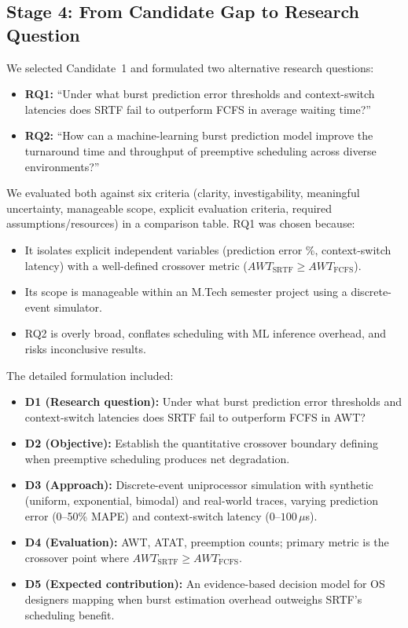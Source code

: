 \documentclass[11pt, a4paper]{article}
\begin{document}
\subsection{Stage 4: From Candidate Gap to Research Question}
We selected Candidate~1 and formulated two alternative research questions:

\begin{itemize}[nosep]
    \item \textbf{RQ1:} ``Under what burst prediction error thresholds and context-switch latencies does SRTF fail to outperform FCFS in average waiting time?''
    \item \textbf{RQ2:} ``How can a machine-learning burst prediction model improve the turnaround time and throughput of preemptive scheduling across diverse environments?''
\end{itemize}

We evaluated both against six criteria (clarity, investigability, meaningful uncertainty, manageable scope, explicit evaluation criteria, required assumptions/resources) in a comparison table. RQ1 was chosen because:
\begin{itemize}[nosep]
    \item It isolates explicit independent variables (prediction error \%, context-switch latency) with a well-defined crossover metric ($AWT_{\text{SRTF}} \ge AWT_{\text{FCFS}}$).
    \item Its scope is manageable within an M.Tech semester project using a discrete-event simulator.
    \item RQ2 is overly broad, conflates scheduling with ML inference overhead, and risks inconclusive results.
\end{itemize}

The detailed formulation included:
\begin{itemize}[nosep]
    \item \textbf{D1 (Research question):} Under what burst prediction error thresholds and context-switch latencies does SRTF fail to outperform FCFS in AWT?
    \item \textbf{D2 (Objective):} Establish the quantitative crossover boundary defining when preemptive scheduling produces net degradation.
    \item \textbf{D3 (Approach):} Discrete-event uniprocessor simulation with synthetic (uniform, exponential, bimodal) and real-world traces, varying prediction error (0--50\% MAPE) and context-switch latency ($0$--$100\,\mu$s).
    \item \textbf{D4 (Evaluation):} AWT, ATAT, preemption counts; primary metric is the crossover point where $AWT_{\text{SRTF}} \ge AWT_{\text{FCFS}}$.
    \item \textbf{D5 (Expected contribution):} An evidence-based decision model for OS designers mapping when burst estimation overhead outweighs SRTF's scheduling benefit.
\end{itemize}
\end{document}
